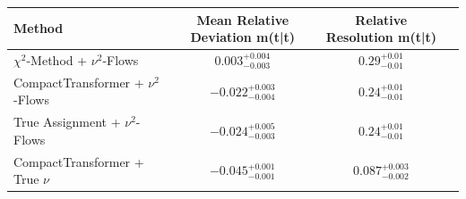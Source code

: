     \begin{tabular}{lccc}
        \toprule
        Method & Mean Relative Deviation m(t\bar{t}) & Relative Resolution m(t\bar{t}) \\
        \midrule
        $\chi^2$-Method + $\nu^2$-Flows & $0.003_{-0.003}^{+0.004}$ & $0.29_{-0.01}^{+0.01}$ \\
        CompactTransformer + $\nu^2$-Flows & $-0.022_{-0.004}^{+0.003}$ & $0.24_{-0.01}^{+0.01}$ \\
        True Assignment + $\nu^2$-Flows & $-0.024_{-0.003}^{+0.005}$ & $0.24_{-0.01}^{+0.01}$ \\
        CompactTransformer + True $\nu$ & $-0.045_{-0.001}^{+0.001}$ & $0.087_{-0.002}^{+0.003}$ \\
        \bottomrule
    \end{tabular}